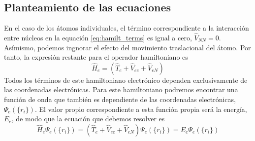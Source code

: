 \documentclass{tufte-book}
\begin{document}
\subsection{Planteamiento de las ecuaciones}
En el caso de los átomos individuales, el término correspondiente
a la interacción entre núcleos en la equación \ref{eq:hamilt_terms}
es igual a cero, $\hat{V}_{NN}=0$. Asímismo, podemos ingnorar el
efecto del movimiento traslacional del átomo. Por tanto, la expresión
restante para el operador hamiltoniano es
\begin{equation}
    \hat{H}_e   =
    (\hat{T}_e + \hat{V}_{ee} +\hat{V}_{eN})
\end{equation}
Todos los términos de este hamiltoniano electrónico dependen 
exclusivamente de las coordenadas electrónicas. Para este 
hamiltoniano podremos encontrar una función de onda que
también es dependiente de las coordenadas electrónicas,
$\Psi_e(\{r_i\})$. El valor propio correspondiente a esta
función propia será la energía, $E_e$, de modo que la 
ecuación que debemos resolver es
\begin{equation}
    \hat{H}_e\Psi_e(\{r_i\})   =
    (\hat{T}_e + \hat{V}_{ee} +\hat{V}_{eN})\Psi_e(\{r_i\})= E_e\Psi_e(\{r_i\})
\end{equation}
\end{document}
